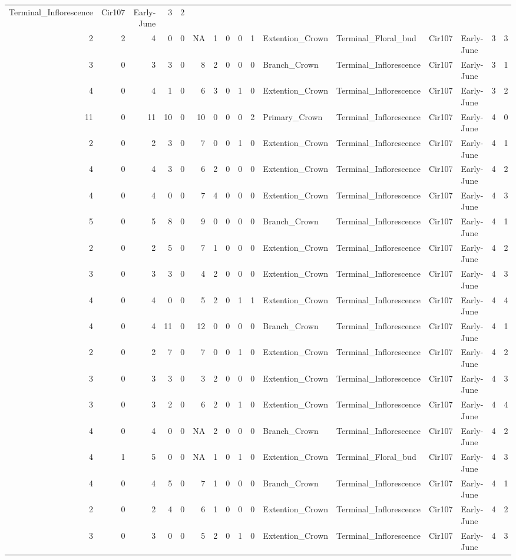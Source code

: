 \documentclass[]{article}
\begin{document}
\begin{longtable}[]{@{}rrrrrrrrrrllllrl@{}}
Terminal\_Inflorescence & Cir107 & Early-June & 3 & 2\tabularnewline
2 & 2 & 4 & 0 & 0 & NA & 1 & 0 & 0 & 1 & Extention\_Crown &
Terminal\_Floral\_bud & Cir107 & Early-June & 3 & 3\tabularnewline
3 & 0 & 3 & 3 & 0 & 8 & 2 & 0 & 0 & 0 & Branch\_Crown &
Terminal\_Inflorescence & Cir107 & Early-June & 3 & 1\tabularnewline
4 & 0 & 4 & 1 & 0 & 6 & 3 & 0 & 1 & 0 & Extention\_Crown &
Terminal\_Inflorescence & Cir107 & Early-June & 3 & 2\tabularnewline
11 & 0 & 11 & 10 & 0 & 10 & 0 & 0 & 0 & 2 & Primary\_Crown &
Terminal\_Inflorescence & Cir107 & Early-June & 4 & 0\tabularnewline
2 & 0 & 2 & 3 & 0 & 7 & 0 & 0 & 1 & 0 & Extention\_Crown &
Terminal\_Inflorescence & Cir107 & Early-June & 4 & 1\tabularnewline
4 & 0 & 4 & 3 & 0 & 6 & 2 & 0 & 0 & 0 & Extention\_Crown &
Terminal\_Inflorescence & Cir107 & Early-June & 4 & 2\tabularnewline
4 & 0 & 4 & 0 & 0 & 7 & 4 & 0 & 0 & 0 & Extention\_Crown &
Terminal\_Inflorescence & Cir107 & Early-June & 4 & 3\tabularnewline
5 & 0 & 5 & 8 & 0 & 9 & 0 & 0 & 0 & 0 & Branch\_Crown &
Terminal\_Inflorescence & Cir107 & Early-June & 4 & 1\tabularnewline
2 & 0 & 2 & 5 & 0 & 7 & 1 & 0 & 0 & 0 & Extention\_Crown &
Terminal\_Inflorescence & Cir107 & Early-June & 4 & 2\tabularnewline
3 & 0 & 3 & 3 & 0 & 4 & 2 & 0 & 0 & 0 & Extention\_Crown &
Terminal\_Inflorescence & Cir107 & Early-June & 4 & 3\tabularnewline
4 & 0 & 4 & 0 & 0 & 5 & 2 & 0 & 1 & 1 & Extention\_Crown &
Terminal\_Inflorescence & Cir107 & Early-June & 4 & 4\tabularnewline
4 & 0 & 4 & 11 & 0 & 12 & 0 & 0 & 0 & 0 & Branch\_Crown &
Terminal\_Inflorescence & Cir107 & Early-June & 4 & 1\tabularnewline
2 & 0 & 2 & 7 & 0 & 7 & 0 & 0 & 1 & 0 & Extention\_Crown &
Terminal\_Inflorescence & Cir107 & Early-June & 4 & 2\tabularnewline
3 & 0 & 3 & 3 & 0 & 3 & 2 & 0 & 0 & 0 & Extention\_Crown &
Terminal\_Inflorescence & Cir107 & Early-June & 4 & 3\tabularnewline
3 & 0 & 3 & 2 & 0 & 6 & 2 & 0 & 1 & 0 & Extention\_Crown &
Terminal\_Inflorescence & Cir107 & Early-June & 4 & 4\tabularnewline
4 & 0 & 4 & 0 & 0 & NA & 2 & 0 & 0 & 0 & Branch\_Crown &
Terminal\_Inflorescence & Cir107 & Early-June & 4 & 2\tabularnewline
4 & 1 & 5 & 0 & 0 & NA & 1 & 0 & 1 & 0 & Extention\_Crown &
Terminal\_Floral\_bud & Cir107 & Early-June & 4 & 3\tabularnewline
4 & 0 & 4 & 5 & 0 & 7 & 1 & 0 & 0 & 0 & Branch\_Crown &
Terminal\_Inflorescence & Cir107 & Early-June & 4 & 1\tabularnewline
2 & 0 & 2 & 4 & 0 & 6 & 1 & 0 & 0 & 0 & Extention\_Crown &
Terminal\_Inflorescence & Cir107 & Early-June & 4 & 2\tabularnewline
3 & 0 & 3 & 0 & 0 & 5 & 2 & 0 & 1 & 0 & Extention\_Crown &
Terminal\_Inflorescence & Cir107 & Early-June & 4 & 3\tabularnewline

\end{longtable}
\end{document}
